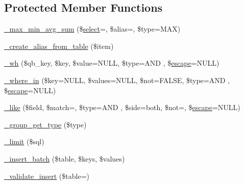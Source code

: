 \subsection*{Protected Member Functions}
\begin{DoxyCompactItemize}
\item 
\mbox{\hyperlink{class_c_i___d_b__query__builder_af0451ac4594126ee27019582f64948a4}{\+\_\+max\+\_\+min\+\_\+avg\+\_\+sum}} (\$\mbox{\hyperlink{class_c_i___d_b__query__builder_a5e5a2d539fab07934c3e5c0699d46fef}{select}}=\textquotesingle{}\textquotesingle{}, \$alias=\textquotesingle{}\textquotesingle{}, \$type=\textquotesingle{}M\+AX\textquotesingle{})
\item 
\mbox{\hyperlink{class_c_i___d_b__query__builder_a5f1e2dbc1f37ebe32b25158ffc9cf9b4}{\+\_\+create\+\_\+alias\+\_\+from\+\_\+table}} (\$item)
\item 
\mbox{\hyperlink{class_c_i___d_b__query__builder_ae7da7cfc4e206d9f962326ed3e0a55a5}{\+\_\+wh}} (\$qb\+\_\+key, \$key, \$value=N\+U\+LL, \$type=\textquotesingle{}A\+ND \textquotesingle{}, \$\mbox{\hyperlink{class_c_i___d_b__driver_a75beb60cdd3ee1875646d729963f5f5f}{escape}}=N\+U\+LL)
\item 
\mbox{\hyperlink{class_c_i___d_b__query__builder_ac5d927ea77115642098054d4804e342c}{\+\_\+where\+\_\+in}} (\$key=N\+U\+LL, \$values=N\+U\+LL, \$not=F\+A\+L\+SE, \$type=\textquotesingle{}A\+ND \textquotesingle{}, \$\mbox{\hyperlink{class_c_i___d_b__driver_a75beb60cdd3ee1875646d729963f5f5f}{escape}}=N\+U\+LL)
\item 
\mbox{\hyperlink{class_c_i___d_b__query__builder_aa084a245f6732555abd55b00ab73713a}{\+\_\+like}} (\$field, \$match=\textquotesingle{}\textquotesingle{}, \$type=\textquotesingle{}A\+ND \textquotesingle{}, \$side=\textquotesingle{}both\textquotesingle{}, \$not=\textquotesingle{}\textquotesingle{}, \$\mbox{\hyperlink{class_c_i___d_b__driver_a75beb60cdd3ee1875646d729963f5f5f}{escape}}=N\+U\+LL)
\item 
\mbox{\hyperlink{class_c_i___d_b__query__builder_ab36c60f24fc92789c616e9f58ba3627f}{\+\_\+group\+\_\+get\+\_\+type}} (\$type)
\item 
\mbox{\hyperlink{class_c_i___d_b__query__builder_a343e4b389bce28c075e5d0183a756af9}{\+\_\+limit}} (\$sql)
\item 
\mbox{\hyperlink{class_c_i___d_b__query__builder_ada6b5ff1e4cb0e6e8fbabc60ca4ef445}{\+\_\+insert\+\_\+batch}} (\$table, \$keys, \$values)
\item 
\mbox{\hyperlink{class_c_i___d_b__query__builder_a2052d3f8bb72b3de359840d94e783044}{\+\_\+validate\+\_\+insert}} (\$table=\textquotesingle{}\textquotesingle{})

\end{DoxyCompactItemize}
